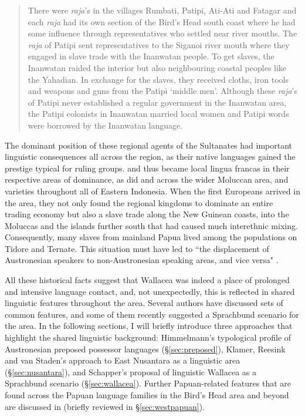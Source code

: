 \begin{quote}There were \textit{raja}'s in the villages Rumbati, Patipi, Ati-Ati and Fatagar and each \textit{raja} had its own section of the Bird's Head south coast where he had some influence through representatives who settled near river mouths. The \textit{raja} of Patipi sent representatives to the Siganoi river mouth where they engaged in slave trade with the Inanwatan people. To get slaves, the Inanwatan raided the interior but also neighbouring coastal peoples like the Yahadian. In exchange for the slaves, they received cloths, iron tools and weapons and guns from the Patipi `middle men'. Although these \textit{raja}'s of Patipi never established a regular government in the Inanwatan area, the Patipi colonists in Inanwatan married local women and Patipi words were borrowed by the Inanwatan language.\end{quote}

The dominant position of these regional agents of the Sultanates had important linguistic consequences all across the region, as their native languages gained the prestige typical for ruling groups.  and  thus became local lingua francas in their respective areas of dominance, as did  and  across the wider Moluccan area, and  varieties throughout all of Eastern Indonesia. When the first Europeans arrived in the area, they not only found the regional kingdoms to dominate an entire trading economy but also a slave trade along the New Guinean coasts, into the Moluccas and the islands further south that had caused much interethnic mixing. Consequently, many slaves from mainland Papua lived among the populations on Tidore and Ternate. This situation must have led to ``the displacement of Austronesian speakers to non-Austronesian speaking areas, and vice versa" \citep[105f.]{klamer2008east}.

All these historical facts suggest that Wallacea was indeed a place of prolonged and intensive language contact, and, not unexpectedly, this is reflected in shared linguistic features throughout the area. Several authors have discussed sets of common features, and some of them recently suggested a Sprachbund scenario for the area. In the following sections, I will briefly introduce three approaches that highlight the shared linguistic background: Himmelmann's typological profile of Austronesian preposed possessor languages (§\ref{sec:preposed}), Klamer, Reesink and van Staden's approach to East Nusantara as a linguistic area (§\ref{sec:nusantara}), and Schapper's proposal of linguistic Wallacea as a Sprachbund scenario (§\ref{sec:wallacea}). Further Papuan-related features that are found across the Papuan language families in the Bird's Head area and beyond are discussed in \citet{reesink2005west} (briefly reviewed in §\ref{sec:westpapuan}).

